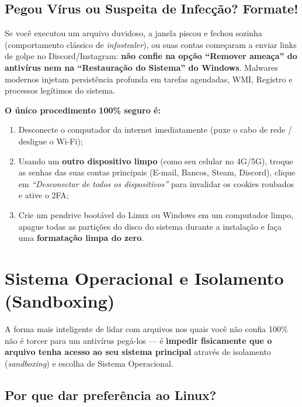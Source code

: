 \documentclass{pousadaguide}
\begin{document}
\subsection{Pegou Vírus ou Suspeita de Infecção? Formate!}

\begin{perigo}
Se você executou um arquivo duvidoso, a janela piscou e fechou sozinha (comportamento clássico de \emph{infostealer}), ou suas contas começaram a enviar links de golpe no Discord/Instagram: \textbf{não confie na opção ``Remover ameaça'' do antivírus nem na ``Restauração do Sistema'' do Windows}. Malwares modernos injetam persistência profunda em tarefas agendadas, WMI, Registro e processos legítimos do sistema.

\textbf{O único procedimento 100\% seguro é:}
\begin{enumerate}
  \item Desconecte o computador da internet imediatamente (puxe o cabo de rede / desligue o Wi-Fi);
  \item Usando um \textbf{outro dispositivo limpo} (como seu celular no 4G/5G), troque as senhas das suas contas principais (E-mail, Bancos, Steam, Discord), clique em \emph{``Desconectar de todos os dispositivos''} para invalidar os cookies roubados e ative o 2FA;
  \item Crie um pendrive bootável do Linux ou Windows em um computador limpo, apague todas as partições do disco do sistema durante a instalação e faça uma \textbf{formatação limpa do zero}.
\end{enumerate}
\end{perigo}

\section{Sistema Operacional e Isolamento (Sandboxing)}

A forma mais inteligente de lidar com arquivos nos quais você não confia 100\% não é torcer para um antivírus pegá-los — é \textbf{impedir fisicamente que o arquivo tenha acesso ao seu sistema principal} através de isolamento (\emph{sandboxing}) e escolha de Sistema Operacional.

\subsection{Por que dar preferência ao Linux?}
\end{document}
